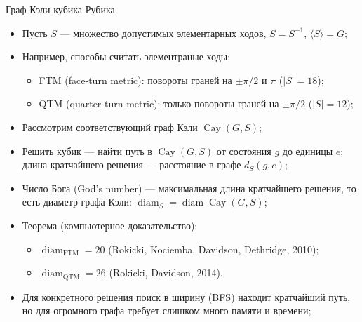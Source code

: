 \documentclass[serif, aspectratio=169]{beamer}
\begin{document}
\begin{frame}{Граф Кэли кубика Рубика}
    \begin{itemize}
        \item Пусть $S$ --- множество допустимых элементарных ходов, $S=S^{-1}$, $\langle S\rangle=G$;
        \item Например, способы считать элементраные ходы:
        \begin{itemize}
            \item FTM (face-turn metric): повороты граней на $\pm\pi/2$ и $\pi$ ($|S|=18$);
            \item QTM (quarter-turn metric): только повороты граней на $\pm\pi/2$ ($|S|=12$);
        \end{itemize}
        \item Рассмотрим соответствующий граф Кэли $\operatorname{Cay}(G,S)$;
        \item Решить кубик --- найти путь в $\operatorname{Cay}(G,S)$ от состояния $g$ до единицы $e$; длина кратчайшего решения --- расстояние в графе $d_S(g,e)$;
        \item Число Бога (God's number) --- максимальная длина кратчайшего решения, то есть диаметр графа Кэли: $\operatorname{diam}_S=\operatorname{diam} \operatorname{Cay}(G,S)$;
        \item Теорема (компьютерное доказательство):
        \begin{itemize}
            \item $\operatorname{diam}_{\mathrm{FTM}}=20$ (Rokicki, Kociemba, Davidson, Dethridge, 2010);
            \item $\operatorname{diam}_{\mathrm{QTM}}=26$ (Rokicki, Davidson, 2014).
        \end{itemize}
        \item Для конкретного решения поиск в ширину (BFS) находит кратчайший путь, но для огромного графа требует слишком много памяти и времени;
    \end{itemize}
\end{frame}
\end{document}
